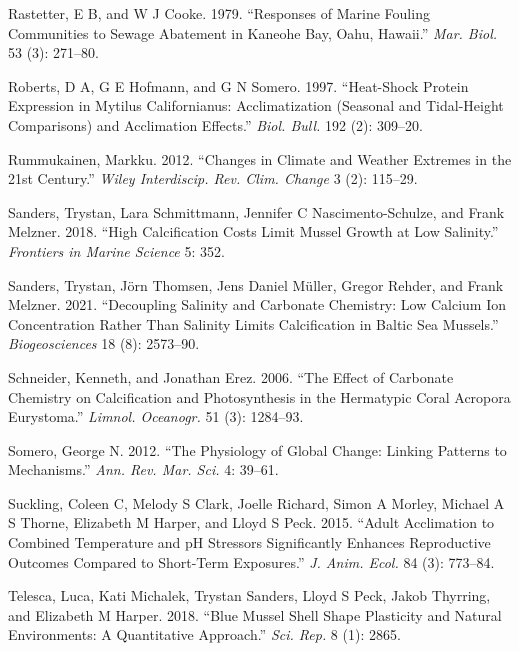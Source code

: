 \documentclass[smallextended]{svjour3}       %
\newlength{\cslhangindent}
\newenvironment{CSLReferences}[2] %
 {%
  \setlength{\parindent}{0pt}
  \ifodd #1 \everypar{\setlength{\hangindent}{\cslhangindent}}\ignorespaces\fi
  \ifnum #2 > 0
  \setlength{\parskip}{#2\baselineskip}
  \fi
 }%
 {}
\begin{document}
\begin{CSLReferences}{1}{0}
\leavevmode{}%
Rastetter, E B, and W J Cooke. 1979. {``Responses of Marine Fouling
Communities to Sewage Abatement in Kaneohe Bay, Oahu, Hawaii.''}
\emph{Mar. Biol.} 53 (3): 271--80.

\leavevmode{}%
Roberts, D A, G E Hofmann, and G N Somero. 1997. {``{Heat-Shock} Protein
Expression in Mytilus Californianus: Acclimatization (Seasonal and
{Tidal-Height} Comparisons) and Acclimation Effects.''} \emph{Biol.
Bull.} 192 (2): 309--20.

\leavevmode{}%
Rummukainen, Markku. 2012. {``Changes in Climate and Weather Extremes in
the 21st Century.''} \emph{Wiley Interdiscip. Rev. Clim. Change} 3 (2):
115--29.

\leavevmode{}%
Sanders, Trystan, Lara Schmittmann, Jennifer C Nascimento-Schulze, and
Frank Melzner. 2018. {``High Calcification Costs Limit Mussel Growth at
Low Salinity.''} \emph{Frontiers in Marine Science} 5: 352.

\leavevmode{}%
Sanders, Trystan, Jörn Thomsen, Jens Daniel Müller, Gregor Rehder, and
Frank Melzner. 2021. {``Decoupling Salinity and Carbonate Chemistry: Low
Calcium Ion Concentration Rather Than Salinity Limits Calcification in
Baltic Sea Mussels.''} \emph{Biogeosciences} 18 (8): 2573--90.

\leavevmode{}%
Schneider, Kenneth, and Jonathan Erez. 2006. {``The Effect of Carbonate
Chemistry on Calcification and Photosynthesis in the Hermatypic Coral
Acropora Eurystoma.''} \emph{Limnol. Oceanogr.} 51 (3): 1284--93.

\leavevmode{}%
Somero, George N. 2012. {``The Physiology of Global Change: Linking
Patterns to Mechanisms.''} \emph{Ann. Rev. Mar. Sci.} 4: 39--61.

\leavevmode{}%
Suckling, Coleen C, Melody S Clark, Joelle Richard, Simon A Morley,
Michael A S Thorne, Elizabeth M Harper, and Lloyd S Peck. 2015. {``Adult
Acclimation to Combined Temperature and pH Stressors Significantly
Enhances Reproductive Outcomes Compared to Short-Term Exposures.''}
\emph{J. Anim. Ecol.} 84 (3): 773--84.

\leavevmode{}%
Telesca, Luca, Kati Michalek, Trystan Sanders, Lloyd S Peck, Jakob
Thyrring, and Elizabeth M Harper. 2018. {``Blue Mussel Shell Shape
Plasticity and Natural Environments: A Quantitative Approach.''}
\emph{Sci. Rep.} 8 (1): 2865.


\end{CSLReferences}
\end{document}
